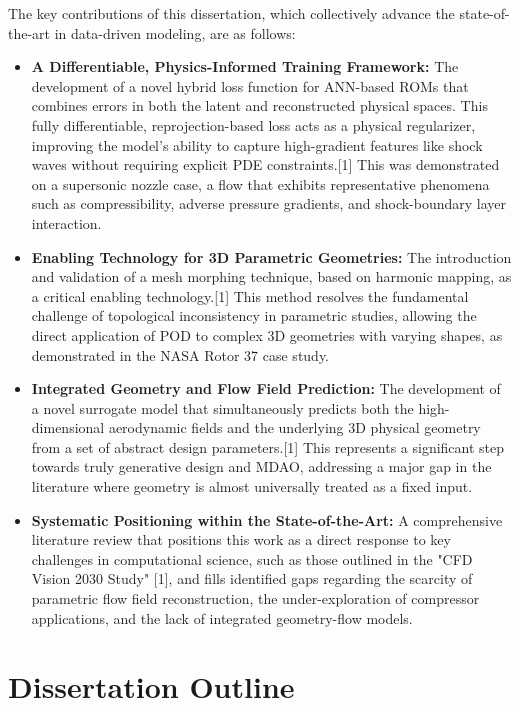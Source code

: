 \documentclass[12pt, a4paper]{report}
\begin{document}
The key contributions of this dissertation, which collectively advance the state-of-the-art in data-driven modeling, are as follows:

\begin{itemize}
    \item \textbf{A Differentiable, Physics-Informed Training Framework:} The development of a novel hybrid loss function for ANN-based ROMs that combines errors in both the latent and reconstructed physical spaces. This fully differentiable, reprojection-based loss acts as a physical regularizer, improving the model's ability to capture high-gradient features like shock waves without requiring explicit PDE constraints.[1] This was demonstrated on a supersonic nozzle case, a flow that exhibits representative phenomena such as compressibility, adverse pressure gradients, and shock-boundary layer interaction.
    \item \textbf{Enabling Technology for 3D Parametric Geometries:} The introduction and validation of a mesh morphing technique, based on harmonic mapping, as a critical enabling technology.[1] This method resolves the fundamental challenge of topological inconsistency in parametric studies, allowing the direct application of POD to complex 3D geometries with varying shapes, as demonstrated in the NASA Rotor 37 case study.
    \item \textbf{Integrated Geometry and Flow Field Prediction:} The development of a novel surrogate model that simultaneously predicts both the high-dimensional aerodynamic fields and the underlying 3D physical geometry from a set of abstract design parameters.[1] This represents a significant step towards truly generative design and MDAO, addressing a major gap in the literature where geometry is almost universally treated as a fixed input.
    \item \textbf{Systematic Positioning within the State-of-the-Art:} A comprehensive literature review that positions this work as a direct response to key challenges in computational science, such as those outlined in the "CFD Vision 2030 Study" [1], and fills identified gaps regarding the scarcity of parametric flow field reconstruction, the under-exploration of compressor applications, and the lack of integrated geometry-flow models.
\end{itemize}

\section{Dissertation Outline}
\end{document}
